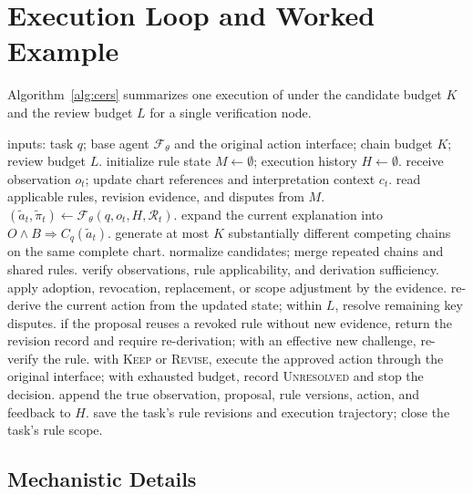 \section{Execution Loop and Worked Example}\label{app:algorithm}

Algorithm~\ref{alg:cers} summarizes one execution of
\ours{} under the candidate budget $K$ and the review
budget $L$ for a single verification node.

\begin{algorithm}[t]
\caption{\ours{} execution loop}
\label{alg:cers}
\begin{algorithmic}[1]
\State inputs: task $q$; base agent $\mathcal{F}_\theta$
and the original action interface; chain budget $K$;
review budget $L$.
\State initialize rule state $M \leftarrow \emptyset$;
execution history $H \leftarrow \emptyset$.
  \State receive observation $o_t$; update chart
  references and interpretation context $c_t$.
  \State read applicable rules, revision evidence, and
  disputes from $M$.
  \State $(\widetilde{a}_t, \widetilde{\pi}_t)
  \leftarrow \mathcal{F}_\theta(q, o_t, H,
  \mathcal{R}_t)$.
    \State expand the current explanation into
    $O \land B \Rightarrow C_q(\widetilde{a}_t)$.
    \State generate at most $K$ substantially different
    competing chains on the same complete chart.
    \State normalize candidates; merge repeated chains
    and shared rules.
    \State verify observations, rule applicability, and
    derivation sufficiency.
    \State apply adoption, revocation, replacement, or
    scope adjustment by the evidence.
    \State re-derive the current action from the updated
    state; within $L$, resolve remaining key disputes.
  \EndIf
  \State if the proposal reuses a revoked rule without
  new evidence, return the revision record and require
  re-derivation; with an effective new challenge,
  re-verify the rule.
  \State with \textsc{Keep} or \textsc{Revise}, execute
  the approved action through the original interface;
  with exhausted budget, record \textsc{Unresolved} and
  stop the decision.
  \State append the true observation, proposal, rule
  versions, action, and feedback to $H$.
\EndFor
\State save the task's rule revisions and execution
trajectory; close the task's rule scope.
\end{algorithmic}
\end{algorithm}

\subsection{Mechanistic Details}\label{app:mechanics}

